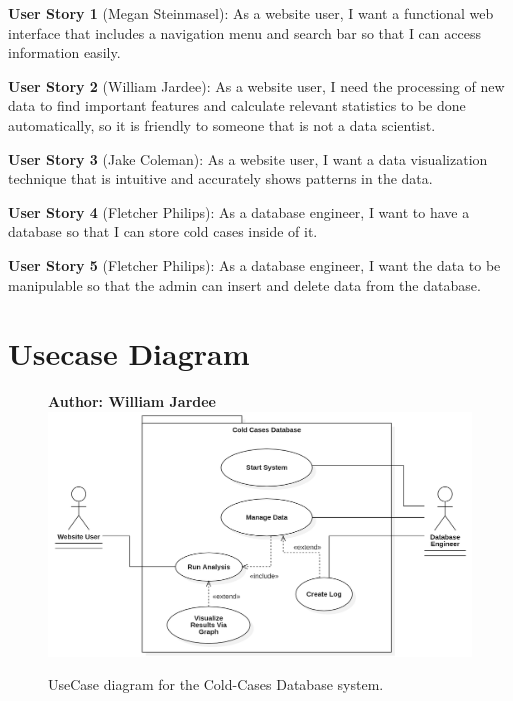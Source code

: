 \documentclass[11pt]{article}
\begin{document}
\noindent\textbf{\hypertarget{us1}{User Story 1}} (Megan Steinmasel):  As a website user, I want a functional web interface that includes a navigation menu and search bar so that I can access information easily.\vspace{0.5em}

\noindent\textbf{\hypertarget{us2}{User Story 2}} (William Jardee): As a website user, I need the processing of new data to find important features and calculate relevant statistics to be done automatically, so it is friendly to someone that is not a data scientist.\vspace{0.5em}

\noindent\textbf{\hypertarget{us3}{User Story 3}} (Jake Coleman): As a website user, I want a data visualization technique that is intuitive and accurately shows patterns in the data.\vspace{0.5em}

\noindent\textbf{\hypertarget{us4}{User Story 4}} (Fletcher Philips): As a database engineer, I want to have a database so that I can store cold cases inside of it. \vspace{0.5em}

\noindent\textbf{\hypertarget{us5}{User Story 5}} (Fletcher Philips): As a database engineer, I want the data to be manipulable so that the admin can insert and delete data from the database.\vspace{0.5em}

\clearpage



\section{Usecase Diagram}

\begin{figure}[!ht]
\centering
\textbf{Author: William Jardee}
	\includegraphics[width=.95\textwidth]{./UseCases/jardee_usecase}\\
	\caption{UseCase diagram for the Cold-Cases Database system.}
	\label{fig:usecase_diagram}
\end{figure}
\clearpage
\end{document}
